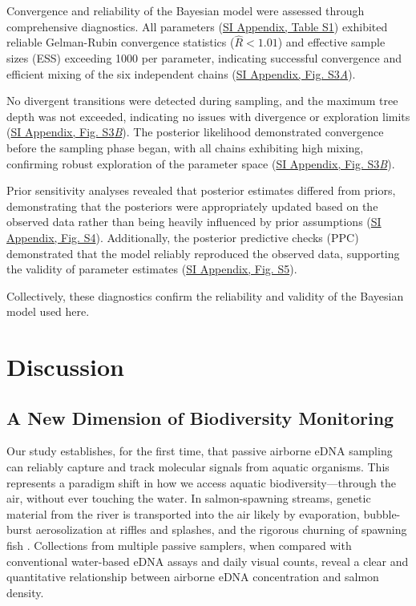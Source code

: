 \documentclass{article}
\begin{document}
Convergence and reliability of the Bayesian model were assessed through comprehensive diagnostics. All parameters (\href{SI_Appendix.pdf}{SI Appendix, Table S1}) exhibited reliable Gelman-Rubin convergence statistics ($\hat{R} < 1.01$) and effective sample sizes (ESS) exceeding 1000 per parameter, indicating successful convergence and efficient mixing of
the six independent chains (\href{SI_Appendix.pdf}{SI Appendix, Fig. S3\textit{A}}). 


No divergent transitions were detected during sampling, and the maximum tree depth was not exceeded, indicating no issues with divergence or exploration limits (\href{SI_Appendix.pdf}{SI Appendix, Fig. S3\textit{B}}). The posterior likelihood demonstrated convergence before the sampling phase began, with all chains exhibiting high mixing, confirming robust exploration of the parameter space (\href{SI_Appendix.pdf}{SI Appendix, Fig. S3\textit{B}}).

Prior sensitivity analyses revealed that posterior estimates differed from priors, demonstrating that the posteriors were appropriately updated based on the observed data rather than being heavily influenced by prior assumptions (\href{SI_Appendix.pdf}{SI Appendix, Fig. S4}). Additionally, the posterior predictive checks (PPC) demonstrated that the model reliably reproduced the observed data, supporting the validity of parameter estimates (\href{SI_Appendix.pdf}{SI Appendix, Fig. S5}). 

Collectively, these diagnostics confirm the reliability and validity of the Bayesian model used here.


\section{Discussion}
\subsection{A New Dimension of Biodiversity Monitoring}
Our study establishes, for the first time, that passive airborne eDNA sampling can reliably capture and track molecular signals from aquatic organisms. This represents a paradigm shift in how we access aquatic biodiversity—through the air, without ever touching the water. In salmon-spawning streams, genetic material from the river is transported into the air likely by evaporation, bubble-burst aerosolization at riffles and splashes, and the rigorous churning of spawning fish \cite{wood2021,prather2013}. Collections from multiple passive samplers, when compared with conventional water-based eDNA assays and daily visual counts, reveal a clear and quantitative relationship between airborne eDNA concentration and salmon density. 
\end{document}
